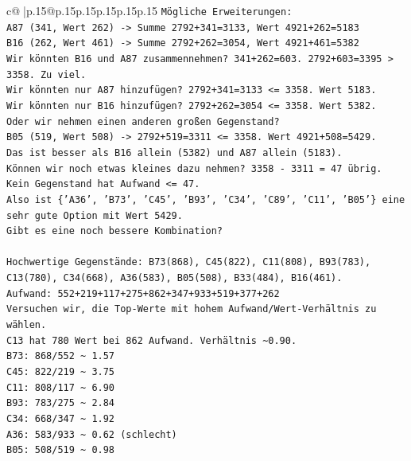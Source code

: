 \documentclass{article}
\begin{document}
{\begin{supertabular}{c@{$\;$}|p{.15\linewidth}@{}p{.15\linewidth}p{.15\linewidth}p{.15\linewidth}p{.15\linewidth}p{.15\linewidth}}
{{{\texttt{Mögliche Erweiterungen:} \\
\texttt{A87 (341, Wert 262) {-}> Summe 2792+341=3133, Wert 4921+262=5183} \\
\texttt{B16 (262, Wert 461) {-}> Summe 2792+262=3054, Wert 4921+461=5382} \\
\texttt{Wir könnten B16 und A87 zusammennehmen? 341+262=603. 2792+603=3395 > 3358. Zu viel.} \\
\texttt{Wir könnten nur A87 hinzufügen? 2792+341=3133 <= 3358. Wert 5183.} \\
\texttt{Wir könnten nur B16 hinzufügen? 2792+262=3054 <= 3358. Wert 5382.} \\
\texttt{Oder wir nehmen einen anderen großen Gegenstand?} \\
\texttt{B05 (519, Wert 508) {-}> 2792+519=3311 <= 3358. Wert 4921+508=5429.} \\
\texttt{Das ist besser als B16 allein (5382) und A87 allein (5183).} \\
\texttt{Können wir noch etwas kleines dazu nehmen? 3358 {-} 3311 = 47 übrig. Kein Gegenstand hat Aufwand <= 47.} \\
\texttt{Also ist \{'A36', 'B73', 'C45', 'B93', 'C34', 'C89', 'C11', 'B05'\} eine sehr gute Option mit Wert 5429.} \\
\texttt{Gibt es eine noch bessere Kombination?} \\
\\ 
\texttt{Hochwertige Gegenstände: B73(868), C45(822), C11(808), B93(783), C13(780), C34(668), A36(583), B05(508), B33(484), B16(461).} \\
\texttt{Aufwand: 552+219+117+275+862+347+933+519+377+262} \\
\texttt{Versuchen wir, die Top{-}Werte mit hohem Aufwand/Wert{-}Verhältnis zu wählen.} \\
\texttt{C13 hat 780 Wert bei 862 Aufwand. Verhältnis \textasciitilde{}0.90.} \\
\texttt{B73: 868/552 \textasciitilde{} 1.57} \\
\texttt{C45: 822/219 \textasciitilde{} 3.75} \\
\texttt{C11: 808/117 \textasciitilde{} 6.90} \\
\texttt{B93: 783/275 \textasciitilde{} 2.84} \\
\texttt{C34: 668/347 \textasciitilde{} 1.92} \\
\texttt{A36: 583/933 \textasciitilde{} 0.62 (schlecht)} \\
\texttt{B05: 508/519 \textasciitilde{} 0.98} \\
}}}
\end{supertabular}}
\end{document}
